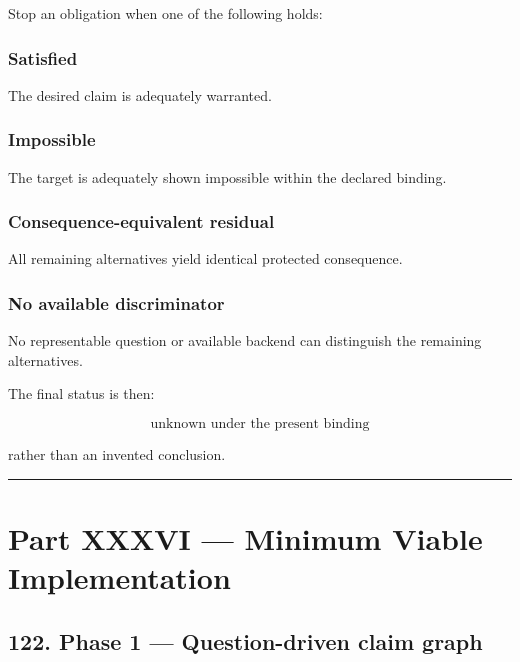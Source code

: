 \documentclass[
]{article}
\begin{document}
Stop an obligation when one of the following holds:

\subsubsection{Satisfied}\label{satisfied}

The desired claim is adequately warranted.

\subsubsection{Impossible}\label{impossible}

The target is adequately shown impossible within the declared binding.

\subsubsection{Consequence-equivalent
residual}\label{consequence-equivalent-residual}

All remaining alternatives yield identical protected consequence.

\subsubsection{No available
discriminator}\label{no-available-discriminator}

No representable question or available backend can distinguish the
remaining alternatives.

The final status is then:

\[
\boxed{
\text{unknown under the present binding}
}
\]

rather than an invented conclusion.

\begin{center}\rule{0.5\linewidth}{0.5pt}\end{center}

\section{Part XXXVI --- Minimum Viable
Implementation}\label{part-xxxvi-minimum-viable-implementation}

\subsection{122. Phase 1 --- Question-driven claim
graph}\label{phase-1-question-driven-claim-graph}
\end{document}
